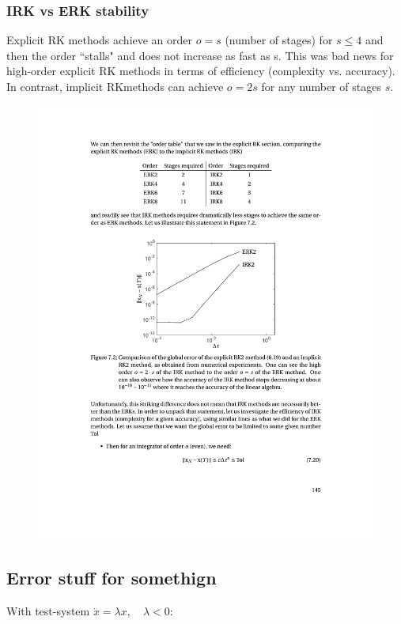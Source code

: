 \subsubsection{IRK vs ERK stability}
Explicit RK methods achieve an order $o = s$ (number of stages) for $s \leq 4$ and then the order “stalls" and does not increase as fast as s. This was bad news for high-order explicit RK methods in terms of efficiency (complexity vs. accuracy). In contrast, implicit RKmethods can achieve $o = 2s$ for any number of stages $s$.
\begin{figure}[h]
    \centering
    \includegraphics[width=\linewidth]{figures/RKStability_Table.pdf}
\end{figure}
\newpage

\subsection{Error stuff for somethign}
With test-system $\dot{x}=\lambda x, \quad \lambda < 0$: \newline

